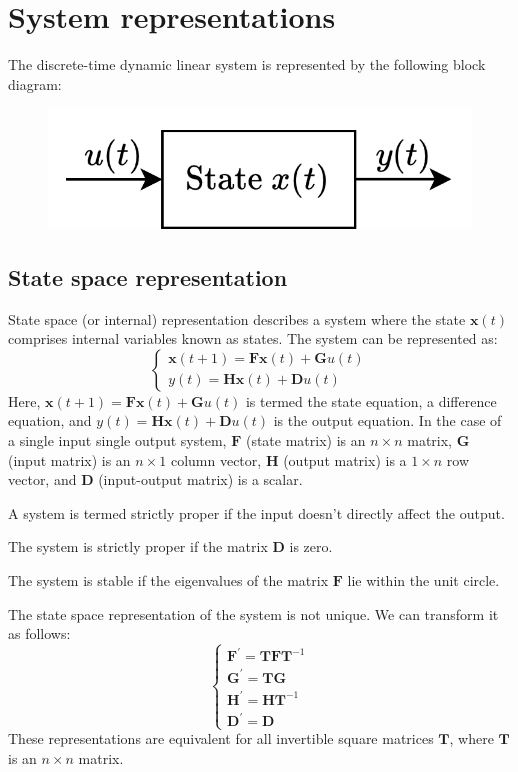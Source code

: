\section{System representations}

The discrete-time dynamic linear system is represented by the following block diagram:
\begin{figure}[H]
    \centering
    \includegraphics[width=0.4\linewidth]{images/rep.png}
\end{figure}

\subsection{State space representation}
State space (or internal) representation describes a system where the state $\mathbf{x}(t)$ comprises internal variables known as states. 
The system can be represented as:
\[\begin{cases}
    \mathbf{x}(t+1)=\mathbf{Fx}(t)+\mathbf{G}u(t) \\
    y(t)=\mathbf{Hx}(t)+\mathbf{D}u(t)
\end{cases}\]
Here, $\mathbf{x}(t+1)=\mathbf{Fx}(t)+\mathbf{G}u(t)$ is termed the state equation, a difference equation, and $y(t)=\mathbf{Hx}(t)+\mathbf{D}u(t)$ is the output equation.
In the case of a single input single output system, $\mathbf{F}$ (state matrix) is an $n \times n$ matrix, $\mathbf{G}$ (input matrix) is an $n \times 1$ column vector, $\mathbf{H}$ (output matrix) is a $1 \times n$ row vector, and $\mathbf{D}$ (input-output matrix) is a scalar. 
\begin{definition}
    A system is termed strictly proper if the input doesn't directly affect the output.
\end{definition}
\begin{property}
    The system is strictly proper if the matrix $\mathbf{D}$ is zero. 
\end{property}    
\begin{property}
    The system is stable if the eigenvalues of the matrix $\mathbf{F}$ lie within the unit circle.
\end{property}
The state space representation of the system is not unique. 
We can transform it as follows:
\[\begin{cases}
    \mathbf{F}^\prime = \mathbf{TFT}^{-1} \\ 
    \mathbf{G}^\prime = \mathbf{TG} \\
    \mathbf{H}^\prime = \mathbf{HT}^{-1} \\ 
    \mathbf{D}^\prime = \mathbf{D}
\end{cases}\]
These representations are equivalent for all invertible square matrices $ \mathbf{T}$, where $ \mathbf{T}$ is an $n \times n$ matrix.

